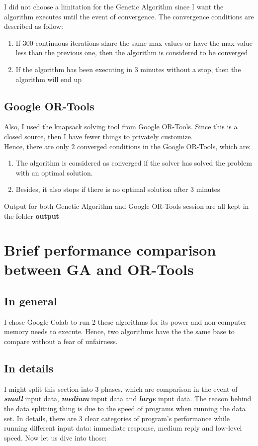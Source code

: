 \documentclass{article}
\begin{document}
I did not choose a limitation for the Genetic Algorithm since I want the algorithm executes until the event of convergence. The convergence conditions are described as follow:
\begin{enumerate}
    \item If 300 continuous iterations share the same max values or have the max value less than the previous one, then the algorithm is considered to be converged
    \item If the algorithm has been executing in 3 minutes without a stop, then the algorithm will end up
\end{enumerate}
\subsection{Google OR-Tools \cite{ortools}}
Also, I used the knapsack solving tool from Google OR-Tools. Since this is a closed source, then I have fewer things to privately customize.\\

Hence, there are only $2$ converged conditions in the Google OR-Tools, which are:
\begin{enumerate}
    \item The algorithm is considered as converged if the solver has solved the problem with an optimal solution.
    \item Besides, it also stops if there is no optimal solution after 3 minutes
\end{enumerate}

Output for both Genetic Algorithm and Google OR-Tools session are all kept in the folder \textbf{output}
\section{Brief performance comparison between GA and OR-Tools}
\subsection{In general}
I chose Google Colab to run 2 these algorithms for its power and non-computer memory needs to execute. Hence, two algorithms have the the same base to compare without a fear of unfairness.
\subsection{In details}
I might split this section into 3 phases, which are comparison in the event of \textit{\textbf{small}}
input data, \textit{\textbf{medium}} input data and \textit{\textbf{large}} input data. The reason behind the data splitting thing is due to the speed of programs when running the data set. In details, there are 3 clear categories of program's performance while running different input data: immediate response, medium reply and low-level speed. Now let us dive into those:
\end{document}
